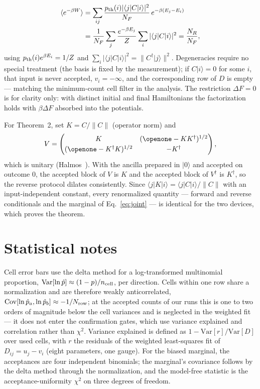 \documentclass[aps,pra,twocolumn,superscriptaddress,nofootinbib]{revtex4-2}
\begin{document}
\begin{align}
\langle e^{-\beta W}\rangle
&=\sum_{ij}\frac{p_{\rm th}(i)|\langle j|C|i\rangle|^2}{N_F}\,e^{-\beta(E_j-E_i)}\nonumber\\
&=\frac{1}{N_F}\sum_j \frac{e^{-\beta E_j}}{Z}\sum_i|\langle j|C|i\rangle|^2
=\frac{N_R}{N_F},
\end{align}
using $p_{\rm th}(i)e^{\beta E_i}=1/Z$ and $\sum_i|\langle j|C|i\rangle|^2=\lVert C^\dagger|j\rangle\rVert^2$. Degeneracies require no special treatment (the basis is fixed by the measurement); if $C|i\rangle=0$ for some $i$, that input is never accepted, $v_i=-\infty$, and the corresponding row of $D$ is empty --- matching the minimum-count cell filter in the analysis. The restriction $\Delta F=0$ is for clarity only: with distinct initial and final Hamiltonians the factorization holds with $\beta\Delta F$ absorbed into the potentials.

For Theorem~2, set $K=C/\lVert C\rVert$ (operator norm) and
\begin{equation}
V=\begin{pmatrix} K & (\openone-KK^\dagger)^{1/2}\\[2pt] (\openone-K^\dagger K)^{1/2} & -K^\dagger \end{pmatrix},
\end{equation}
which is unitary (Halmos~\cite{sznagy2010}). With the ancilla prepared in $|0\rangle$ and accepted on outcome $0$, the accepted block of $V$ is $K$ and the accepted block of $V^\dagger$ is $K^\dagger$, so the reverse protocol dilates consistently. Since $\langle j|K|i\rangle=\langle j|C|i\rangle/\lVert C\rVert$ with an input-independent constant, every renormalized quantity --- forward and reverse conditionals and the marginal of Eq.~\eqref{eq:joint} --- is identical for the two devices, which proves the theorem.

\section{Statistical notes}
\label{app:stats}
Cell error bars use the delta method for a log-transformed multinomial proportion, $\mathrm{Var}[\ln\hat p]\approx(1-p)/n_{\rm cell}$, per direction. Cells within one row share a normalization and are therefore weakly anticorrelated, $\mathrm{Cov}[\ln\hat p_a,\ln\hat p_b]\approx-1/N_{\rm row}$; at the accepted counts of our runs this is one to two orders of magnitude below the cell variances and is neglected in the weighted fit --- it does not enter the confirmation gates, which use variance explained and correlation rather than $\chi^2$. Variance explained is defined as $1-\mathrm{Var}[r]/\mathrm{Var}[D]$ over used cells, with $r$ the residuals of the weighted least-squares fit of $D_{ij}=u_j-v_i$ (eight parameters, one gauge). For the biased marginal, the acceptances are four independent binomials; the marginal's covariance follows by the delta method through the normalization, and the model-free statistic is the acceptance-uniformity $\chi^2$ on three degrees of freedom.
\end{document}
